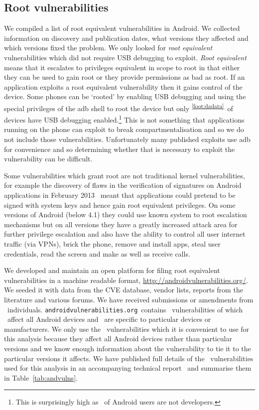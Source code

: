 \documentclass[conference,a4paper,twoside]{IEEEtran}
\newcommand{\dafoot}{\textsuperscript{\ref{foot:dadata}}}
\newcommand{\avo}{\texttt{androidvulnerabilities.org}}
\begin{document}
\subsection{Root vulnerabilities}
We compiled a list of root equivalent vulnerabilities in Android.
We collected information on discovery and publication dates, what versions they affected and which versions fixed the problem.
We only looked for \emph{root equivalent} vulnerabilities which did not require USB debugging to exploit.
\emph{Root equivalent} means that it escalates to privileges equivalent in scope to root in that either they can be used to gain root or they provide permissions as bad as root.
If an application exploits a root equivalent vulnerability then it gains control of the device.
Some phones can be `rooted' by enabling USB debugging and using the special privileges of the adb shell to root the device but only \daAdbEnabledPerc\dafoot\ of devices have USB debugging enabled.\footnote{This is surprisingly high as \daAdbEnabledPerc\ of Android users are not developers.}
This is not something that applications running on the phone can exploit to break compartmentalisation and so we do not include those vulnerabilities.
Unfortunately many published exploits use adb for convenience and so determining whether that is necessary to exploit the vulnerability can be difficult.

Some vulnerabilities which grant root are not traditional kernel vulnerabilities, for example the discovery of flaws in the verification of signatures on Android applications in February 2013~\cite{Forristal2013} meant that applications could pretend to be signed with system keys and hence gain root equivalent privileges.
On some versions of Android (below 4.1) they could use known system to root escalation mechanisms but on all versions they have a greatly increased attack area for further privilege escalation and also have the ability to control all user internet traffic (via VPNs), brick the phone, remove and install apps, steal user credentials, read the screen and make as well as receive calls.

\avoTabAndVulns

We developed and maintain an open platform for filing root equivalent vulnerabilities in a machine readable format, \url{http://androidvulnerabilities.org/}.
We seeded it with data from the CVE database, vendor lists, reports from the literature and various forums.
We have received submissions or amendments from \avoNumSubmitters\ individuals.
\avo\ contains \avoNumVulnerabilities\ vulnerabilities of which \avoNumVulnAllAndroid\ affect all Android devices and \avoNumVulnSpecific\ are specific to particular devices or manufacturers.
We only use the \daNumVulnsUsed\ vulnerabilities which it is convenient to use for this analysis because they affect all Android devices rather than particular versions and we know enough information about the vulnerability to tie it to the particular versions it affects.
We have published full details of the \daNumVulnsUsed\ vulnerabilities used for this analysis in an accompanying technical report~\cite{TODO} and summarise them in Table~\ref{tab:andvulns}.
\end{document}
